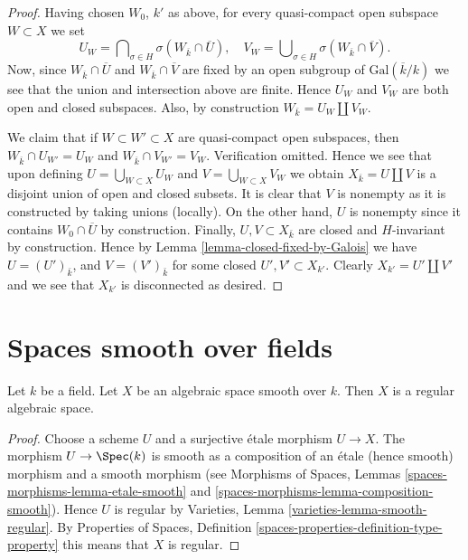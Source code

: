 \begin{proof}
\medskip\noindent
Having chosen $W_0$, $k'$ as above, for every quasi-compact open subspace
$W \subset X$ we set
$$
U_W =
\bigcap\nolimits_{\sigma \in H} \sigma(W_{\overline{k}} \cap \overline{U}),
\quad
V_W =
\bigcup\nolimits_{\sigma \in H} \sigma(W_{\overline{k}} \cap \overline{V}).
$$
Now, since $W_{\overline{k}} \cap \overline{U}$ and
$W_{\overline{k}} \cap \overline{V}$ are fixed by an open subgroup of
$\text{Gal}(\overline{k}/k)$ we see that the union and intersection
above are finite. Hence $U_W$ and $V_W$ are both open and closed subspaces.
Also, by construction $W_{\bar k} = U_W \amalg V_W$.

\medskip\noindent
We claim that if $W \subset W' \subset X$ are quasi-compact
open subspaces, then $W_{\overline{k}} \cap U_{W'} = U_W$ and
$W_{\overline{k}} \cap V_{W'} = V_W$. Verification omitted.
Hence we see that upon defining $U = \bigcup_{W \subset X} U_W$
and $V = \bigcup_{W \subset X} V_W$ we obtain
$X_{\overline{k}} = U \amalg V$ is a disjoint union of open
and closed subsets.
It is clear that $V$ is nonempty as it is constructed by taking
unions (locally). On the other hand, $U$ is nonempty since it contains
$W_0 \cap \overline{U}$ by construction. Finally, $U, V \subset X_{\bar k}$
are closed and $H$-invariant by construction. Hence by
Lemma \ref{lemma-closed-fixed-by-Galois}
we have $U = (U')_{\bar k}$, and $V = (V')_{\bar k}$ for some
closed $U', V' \subset X_{k'}$. Clearly $X_{k'} = U' \amalg V'$
and we see that $X_{k'}$ is disconnected as desired.
\end{proof}









\section{Spaces smooth over fields}
\label{section-smooth}



\begin{lemma}
\label{lemma-smooth-regular}
Let $k$ be a field.
Let $X$ be an algebraic space smooth over $k$.
Then $X$ is a regular algebraic space.
\end{lemma}

\begin{proof}
Choose a scheme $U$ and a surjective \'etale morphism $U \to X$.
The morphism $U \to \Spec(k)$ is smooth as a composition of
an \'etale (hence smooth) morphism and a smooth morphism (see
Morphisms of Spaces, Lemmas \ref{spaces-morphisms-lemma-etale-smooth}
and \ref{spaces-morphisms-lemma-composition-smooth}).
Hence $U$ is regular by
Varieties, Lemma \ref{varieties-lemma-smooth-regular}.
By
Properties of Spaces, Definition
\ref{spaces-properties-definition-type-property}
this means that $X$ is regular.
\end{proof}

